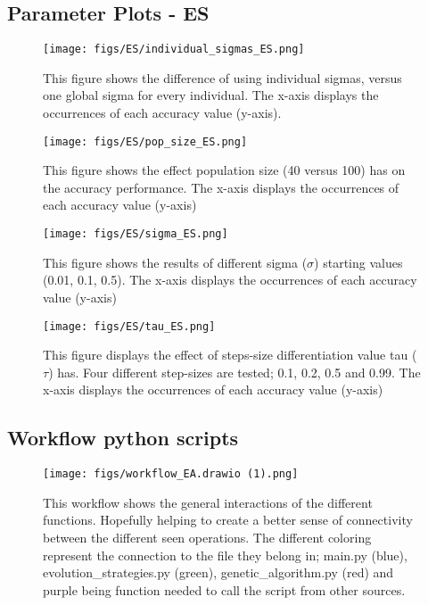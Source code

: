 \documentclass{article}
\begin{document}
\newpage


\subsection{Parameter Plots - ES}
\label{app:params_es}

\begin{figure*}[htbp]
    \centering
    \texttt{[image: figs/ES/individual\_sigmas\_ES.png]}
    \caption{
    This figure shows the difference of using individual sigmas, versus one global sigma for every individual. 
    The x-axis displays the occurrences of each accuracy value (y-axis).
    }
    \label{fig:A_ES_indivsigma}
\end{figure*}



\begin{figure*}[htbp]
    \centering
    \texttt{[image: figs/ES/pop\_size\_ES.png]}
    \caption{
    This figure shows the effect population size (40 versus 100) has on the accuracy performance. 
    The x-axis displays the occurrences of each accuracy value (y-axis) 
    }
    \label{fig:A_ES_popsize}
\end{figure*}


\begin{figure*}[htbp]
    \centering
    \texttt{[image: figs/ES/sigma\_ES.png]}
    \caption{
    This figure shows the results of different sigma ($\sigma$) starting values (0.01, 0.1, 0.5). 
    The x-axis displays the occurrences of each accuracy value (y-axis)
    }
    \label{fig:A_ES_sigmas}
\end{figure*}


\begin{figure*}[htbp]
    \centering
    \texttt{[image: figs/ES/tau\_ES.png]}
    \caption{
    This figure displays the effect of steps-size differentiation value tau ($\tau$) has. 
    Four different step-sizes are tested; 0.1, 0.2, 0.5 and 0.99. 
    The x-axis displays the occurrences of each accuracy value (y-axis)
    }
    \label{fig:A_ES_tau}
\end{figure*}

\newpage

\subsection{Workflow python scripts}
\label{app:workflow}

\begin{figure}[htbp]
    \centering
    \texttt{[image: figs/workflow\_EA.drawio (1).png]}
    \caption{ 
        This workflow shows the general interactions of the different functions. 
        Hopefully helping to create a better sense of connectivity between the different seen operations. 
        The different coloring represent the connection to the file they belong in; 
        main.py (blue), evolution\_strategies.py (green), genetic\_algorithm.py (red) and purple being function needed to call the script from other sources.
    }
    \label{fig:A_workflow}
\end{figure}
\end{document}
